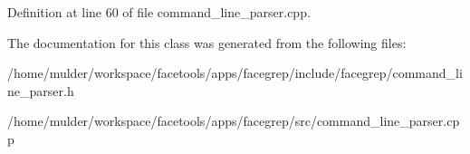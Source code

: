 Definition at line 60 of file command\+\_\+line\+\_\+parser.\+cpp.



The documentation for this class was generated from the following files\+:\begin{DoxyCompactItemize}
\item 
/home/mulder/workspace/facetools/apps/facegrep/include/facegrep/command\+\_\+line\+\_\+parser.\+h\item 
/home/mulder/workspace/facetools/apps/facegrep/src/command\+\_\+line\+\_\+parser.\+cpp\end{DoxyCompactItemize}
